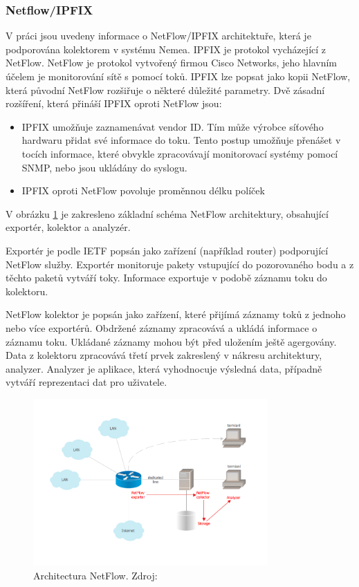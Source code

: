 \documentclass[thesis=M,czech]{FITthesis}[2012/06/26]
\begin{document}
\subsubsection{Netflow/IPFIX}
V práci jsou uvedeny informace o NetFlow/IPFIX architektuře, která je podporována kolektorem v systému Nemea. IPFIX je protokol vycházející z NetFlow. NetFlow je protokol vytvořený firmou Cisco Networks, jeho hlavním účelem je monitorování sítě s pomocí toků. IPFIX lze popsat jako kopii NetFlow, která původní NetFlow rozšiřuje o některé důležité parametry.\cite{netflowvsipfix}
Dvě zásadní rozšíření, která přináší IPFIX oproti NetFlow jsou:
\begin{itemize}
	\item IPFIX umožňuje zaznamenávat vendor ID. Tím může výrobce síťového hardwaru přidat své informace do toku. Tento postup umožňuje přenášet v tocích informace, které obvykle zpracovávají monitorovací systémy pomocí SNMP, nebo jsou ukládány do syslogu.
	\item IPFIX oproti NetFlow povoluje proměnnou délku políček
\end{itemize}\par
V obrázku \ref{img:netflow_architecture} je zakresleno základní schéma NetFlow architektury, obsahující exportér, kolektor a analyzér.\par
Exportér je podle IETF popsán jako zařízení (například router) podporující NetFlow služby. Exportér monitoruje pakety vstupující do pozorovaného bodu a z těchto paketů vytváří toky. Informace exportuje v podobě záznamu toku do kolektoru.\par
NetFlow kolektor je popsán jako zařízení, které přijímá záznamy toků z jednoho nebo více exportérů. Obdržené záznamy zpracovává a ukládá informace o záznamu toku. Ukládané záznamy mohou být před uložením ještě agergovány.\cite{ietfnetflow}
Data z kolektoru zpracovává třetí prvek zakreslený v nákresu architektury, analyzer. Analyzer je aplikace, která vyhodnocuje výsledná data, případně vytváří reprezentaci dat pro uživatele.\cite{netflow_arch}
	\begin{figure}[!htbp]\centering
		\includegraphics[width=0.8\textwidth]{netflow-architecture.png}
		\caption[Architectura NetFlow. Zdroj: \cite{netflow_arch}]{Architectura NetFlow. Zdroj: \cite{netflow_arch}}
		\label{img:netflow_architecture}
	\end{figure}
\par
\end{document}
